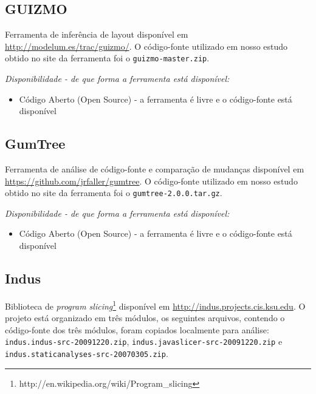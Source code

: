 \subsection{GUIZMO}

Ferramenta de inferência de layout disponível em
\url{http://modelum.es/trac/guizmo/}. O código-fonte
utilizado em nosso estudo obtido no site da ferramenta foi o
\texttt{guizmo-master.zip}.

\begin{description}

  \item {\it Disponibilidade - de que forma a ferramenta está disponível:}
    \begin{itemize}
      \item Código Aberto (Open Source) - a ferramenta é livre e o código-fonte está disponível
    \end{itemize}

\end{description}

\subsection{GumTree}

Ferramenta de análise de código-fonte e comparação de mudanças
disponível em \url{https://github.com/jrfaller/gumtree}. O
código-fonte utilizado em nosso estudo obtido no site da ferramenta foi o
\texttt{gumtree-2.0.0.tar.gz}.

\begin{description}

  \item {\it Disponibilidade - de que forma a ferramenta está disponível:}
    \begin{itemize}
      \item Código Aberto (Open Source) - a ferramenta é livre e o código-fonte está disponível
    \end{itemize}

\end{description}

\subsection{Indus}

Biblioteca de {\it program
slicing}\footnote{http://en.wikipedia.org/wiki/Program\_slicing} disponível em
\url{http://indus.projects.cis.ksu.edu}. O projeto está organizado em três
módulos, os seguintes arquivos, contendo o código-fonte dos três módulos,
foram copiados localmente para análise:
\texttt{indus.indus-src-20091220.zip},
\texttt{indus.javaslicer-src-20091220.zip} e
\texttt{indus.staticanalyses-src-20070305.zip}.

